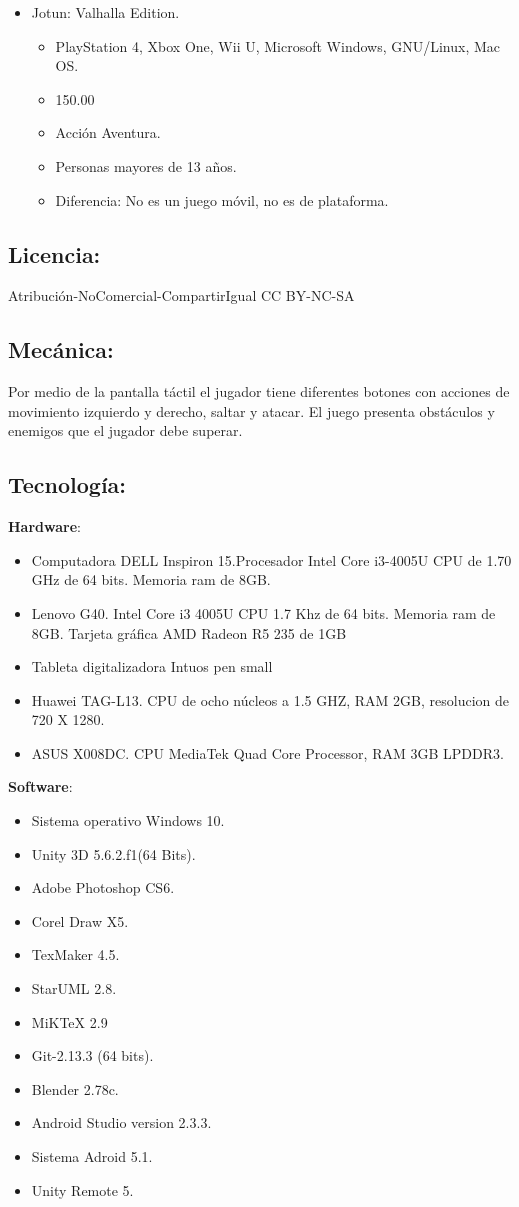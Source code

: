 \documentclass[11pt,letterpaper]{article}
\begin{document}
\begin{itemize}
\item Jotun: Valhalla Edition.
\begin{itemize}
	\item PlayStation 4, Xbox One, Wii U, Microsoft Windows, GNU/Linux, Mac OS.
	\item 150.00
	\item Acción Aventura.
	\item Personas mayores de 13 años.
	\item Diferencia: No es un juego móvil, no es de plataforma.
\end{itemize}

\end{itemize}

	\subsection{Licencia:}
Atribución-NoComercial-CompartirIgual 
CC BY-NC-SA
	\subsection{Mecánica:}
	Por medio de la pantalla táctil el jugador tiene diferentes botones con acciones de movimiento izquierdo y derecho, saltar y atacar.
	El juego presenta obstáculos y enemigos que el jugador debe superar.
	\subsection{Tecnología:}
\textbf{Hardware}:
\begin{itemize}
	\item Computadora DELL Inspiron 15.Procesador Intel Core i3-4005U CPU de 1.70 GHz de 64 bits. Memoria ram de 8GB.
	\item Lenovo G40. Intel Core i3 4005U CPU 1.7 Khz de 64 bits. Memoria ram de 8GB. Tarjeta gráfica AMD Radeon R5 235 de 1GB
	\item Tableta digitalizadora Intuos pen small
	\item Huawei TAG-L13. CPU de ocho núcleos a 1.5 GHZ, RAM 2GB, resolucion de 720 X 1280.
	\item ASUS X008DC. CPU MediaTek Quad Core Processor, RAM 3GB LPDDR3.
\end{itemize}
\textbf{Software}:
\begin{itemize}
	\item Sistema operativo Windows 10.
	\item Unity 3D 5.6.2.f1(64 Bits).
	\item Adobe Photoshop CS6.
	\item Corel Draw X5.
	\item TexMaker 4.5.
	\item StarUML 2.8.
	\item MiKTeX 2.9
	\item Git-2.13.3 (64 bits).
	\item Blender 2.78c.
	\item Android Studio version 2.3.3.
	\item Sistema Adroid 5.1.
	\item Unity Remote 5.
	
\end{itemize}		
\end{document}
